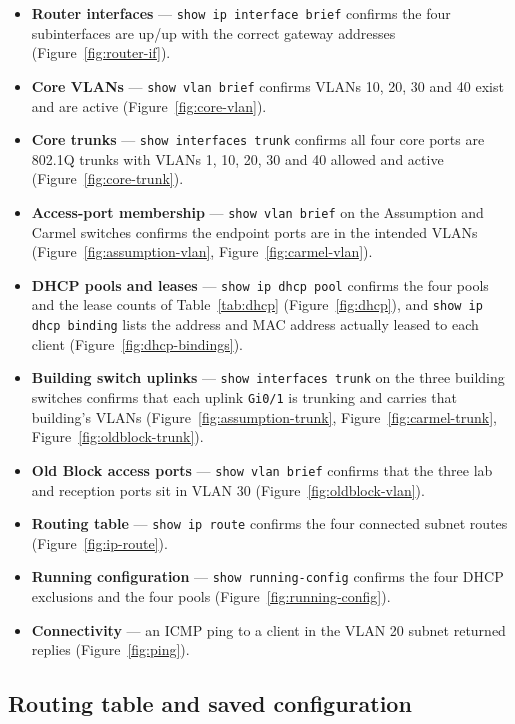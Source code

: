 \documentclass[11pt,a4paper]{article}
\newcommand{\figref}[1]{Figure~\ref{#1}}
\begin{document}
\begin{itemize}
  \item \textbf{Router interfaces} --- \texttt{show ip interface brief} confirms the four
        subinterfaces are up/up with the correct gateway addresses
        (\figref{fig:router-if}).
  \item \textbf{Core VLANs} --- \texttt{show vlan brief} confirms VLANs 10, 20, 30 and 40
        exist and are active (\figref{fig:core-vlan}).
  \item \textbf{Core trunks} --- \texttt{show interfaces trunk} confirms all four core
        ports are 802.1Q trunks with VLANs 1, 10, 20, 30 and 40 allowed and active
        (\figref{fig:core-trunk}).
  \item \textbf{Access-port membership} --- \texttt{show vlan brief} on the Assumption and
        Carmel switches confirms the endpoint ports are in the intended VLANs
        (\figref{fig:assumption-vlan}, \figref{fig:carmel-vlan}).
  \item \textbf{DHCP pools and leases} --- \texttt{show ip dhcp pool} confirms the four
        pools and the lease counts of Table~\ref{tab:dhcp} (\figref{fig:dhcp}), and
        \texttt{show ip dhcp binding} lists the address and MAC address actually leased
        to each client (\figref{fig:dhcp-bindings}).
  \item \textbf{Building switch uplinks} --- \texttt{show interfaces trunk} on the three
        building switches confirms that each uplink \texttt{Gi0/1} is trunking and
        carries that building's VLANs (\figref{fig:assumption-trunk},
        \figref{fig:carmel-trunk}, \figref{fig:oldblock-trunk}).
  \item \textbf{Old Block access ports} --- \texttt{show vlan brief} confirms that the
        three lab and reception ports sit in VLAN 30 (\figref{fig:oldblock-vlan}).
  \item \textbf{Routing table} --- \texttt{show ip route} confirms the four connected
        subnet routes (\figref{fig:ip-route}).
  \item \textbf{Running configuration} --- \texttt{show running-config} confirms the four
        DHCP exclusions and the four pools (\figref{fig:running-config}).
  \item \textbf{Connectivity} --- an ICMP ping to a client in the VLAN 20 subnet returned
        replies (\figref{fig:ping}).
\end{itemize}

\subsection{Routing table and saved configuration}
\end{document}
